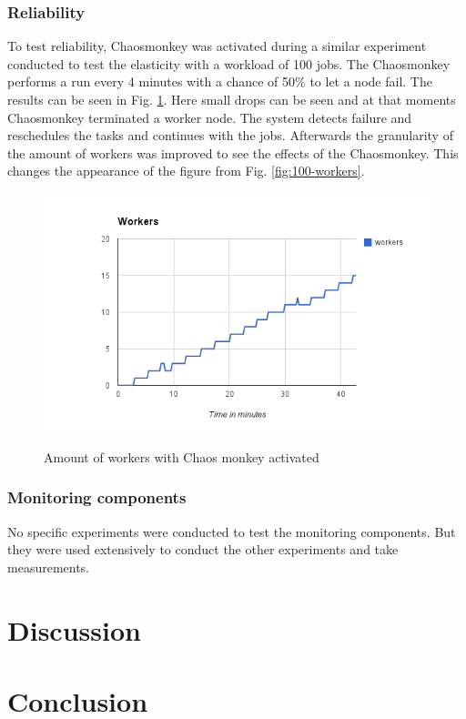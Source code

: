\documentclass[a4paper]{IEEEtran}
\begin{document}
\subsubsection{Reliability}
To test reliability, Chaosmonkey was activated during a similar experiment conducted to test the elasticity with a workload of 100 jobs.
The Chaosmonkey performs a run every 4 minutes with a chance of 50\% to let a node fail.
The results can be seen in Fig. \ref{fig:chaos-workers}.
Here small drops can be seen and at that moments Chaosmonkey terminated a worker node.
The system detects failure and reschedules the tasks and continues with the jobs.
Afterwards the granularity of the amount of workers was improved to see the effects of the Chaosmonkey.
This changes the appearance of the figure from Fig. \ref{fig:100-workers}.

\begin{figure}[ht]
	\includegraphics[scale=0.45]{fig/chaos-workers.png}
	\label{fig:chaos-workers}
	\caption{Amount of workers with Chaos monkey activated}
\end{figure}

\subsubsection{Monitoring components}
No specific experiments were conducted to test the monitoring components.
But they were used extensively to conduct the other experiments and take measurements.

\section{Discussion}

\section{Conclusion}
\end{document}
